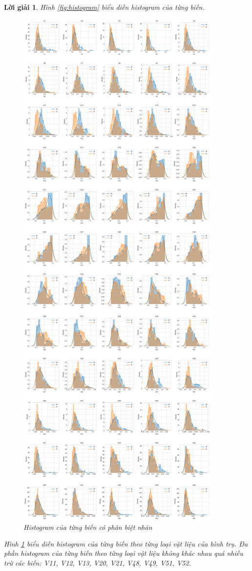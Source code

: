 \documentclass[14pt, a4paper]{article}
\theoremstyle{sltheorem}
\theoremstyle{soltheorem}
\newtheorem*{loigiai}{Lời giải}
\begin{document}
\begin{loigiai}
    Hình \ref{fig:histogram} biểu diễn histogram của từng biến.
    
    \begin{figure}[h!]
        \centering
        \includegraphics[scale=0.2]{figures/histogram_against_label.png}
        \caption{Histogram của từng biến có phân biệt nhãn}
        \label{fig:histogram_against_label}
    \end{figure}

    Hình \ref{fig:histogram_against_label} biểu diễn histogram của từng biến theo từng loại vật liệu của hình trụ.
    Đa phần histogram của từng biến theo từng loại vật liệu không khác nhau quá nhiều trừ các biến: V11, V12, V13, V20, V21, V48, V49, V51, V52.

\end{loigiai}
\end{document}
